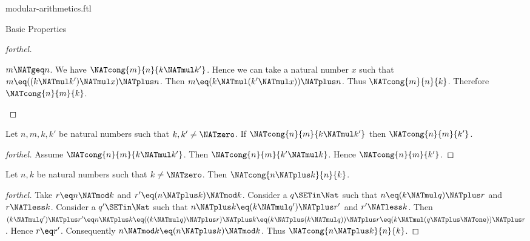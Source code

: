 \documentclass{naproche-library}
\begin{document}
\begin{smodule}[title=Modular Arithmetics]{modular-arithmetics.ftl}
\begin{sfragment}{Basic Properties}
\begin{proof}[forthel]
    \begin{case}{$m \NATgeq n$.}
      We have $\NATcong{m}{n}{k \NATmul k'}$.
      Hence we can take a natural number $x$ such that $m \eq ((k \NATmul k') \NATmul x) \NATplus n$.
      Then $m \eq (k \NATmul (k' \NATmul x)) \NATplus n$.
      Thus $\NATcong{m}{n}{k}$.
      Therefore $\NATcong{n}{m}{k}$.
    \end{case}
  \end{proof}

  \begin{corollary}[forthel,id=ARITHMETIC_08_5895145169879040]
    Let $n, m, k, k'$ be natural numbers such that $k, k' \neq \NATzero$.
    If $\NATcong{n}{m}{k \NATmul k'}$ then $\NATcong{n}{m}{k'}$.
  \end{corollary}
  \begin{proof}[forthel]
    Assume $\NATcong{n}{m}{k \NATmul k'}$.
    Then $\NATcong{n}{m}{k' \NATmul k}$.
    Hence $\NATcong{n}{m}{k'}$.
  \end{proof}

  \begin{proposition}[forthel,id=ARITHMETIC_08_5984712287846400]
    Let $n, k$ be natural numbers such that $k \neq \NATzero$.
    Then $\NATcong{n \NATplus k}{n}{k}$.
  \end{proposition}
  \begin{proof}[forthel]
    Take $r \eq n \NATmod k$ and $r' \eq (n \NATplus k) \NATmod k$.
    Consider a $q \SETin \Nat$ such that $n \eq (k \NATmul q) \NATplus r$ and $r \NATless k$.
    Consider a $q' \SETin \Nat$ such that $n \NATplus k \eq (k \NATmul q') \NATplus r'$ and
    $r' \NATless k$.
    Then $(k \NATmul q') \NATplus r'
      \eq n \NATplus k
      \eq ((k \NATmul q) \NATplus r) \NATplus k
      \eq (k \NATplus (k \NATmul q)) \NATplus r
      \eq (k \NATmul (q \NATplus \NATone)) \NATplus r$.
    Hence $r \eq r'$.
    Consequently $n \NATmod k \eq (n \NATplus k) \NATmod k$.
    Thus $\NATcong{n \NATplus k}{n}{k}$.
  \end{proof}
\end{sfragment}
\end{smodule}
\end{document}
